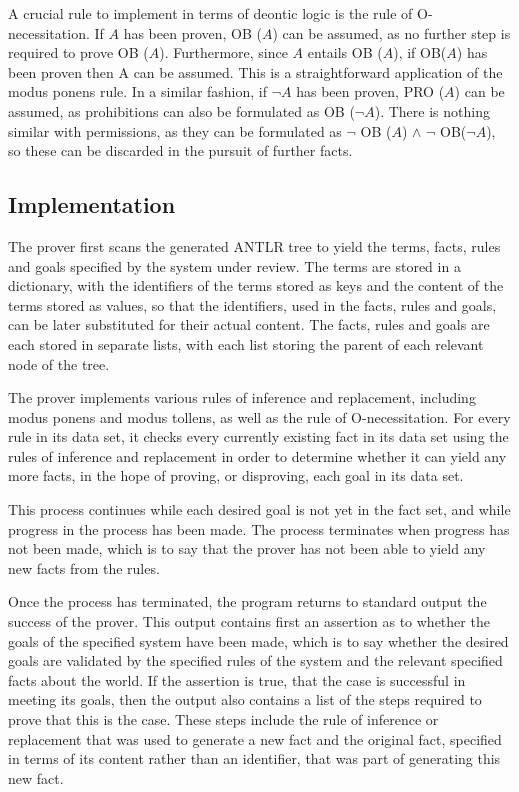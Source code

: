\documentclass{l4proj}
\begin{document}
A crucial rule to implement in terms of deontic logic is the rule of O-necessitation. If $A$ has been proven, OB ($A$) can be assumed, as no further step is required to prove OB ($A$). Furthermore, since $A$ entails OB ($A$), if OB($A$) has been proven then A can be assumed. This is a straightforward application of the modus ponens rule. In a similar fashion, if $\neg A$ has been proven, PRO ($A$) can be assumed, as prohibitions can also be formulated as OB ($\neg A$). There is nothing similar with permissions, as they can be formulated as $\neg$ OB ($A$) $\land$ $\neg$ OB($\neg A$), so these can be discarded in the pursuit of further facts. 

\subsection{Implementation}
The prover first scans the generated ANTLR tree to yield the terms, facts, rules and goals specified by the system under review. The terms are stored in a dictionary, with the identifiers of the terms stored as keys and the content of the terms stored as values, so that the identifiers, used in the facts, rules and goals, can be later substituted for their actual content. The facts, rules and goals are each stored in separate lists, with each list storing the parent of each relevant node of the tree. 

The prover implements various rules of inference and replacement, including modus ponens and modus tollens, as well as the rule of O-necessitation. For every rule in its data set, it checks every currently existing fact in its data set using the rules of inference and replacement in order to determine whether it can yield any more facts, in the hope of proving, or disproving, each goal in its data set. 

This process continues while each desired goal is not yet in the fact set, and while progress in the process has been made. The process terminates when progress has not been made, which is to say that the prover has not been able to yield any new facts from the rules. 

Once the process has terminated, the program returns to standard output the success of the prover. This output contains first an assertion as to whether the goals of the specified system have been made, which is to say whether the desired goals are validated by the specified rules of the system and the relevant specified facts about the world. If the assertion is true, that the case is successful in meeting its goals, then the output also contains a list of the steps required to prove that this is the case. These steps include the rule of inference or replacement that was used to generate a new fact and the original fact, specified in terms of its content rather than an identifier, that was part of generating this new fact. 
\end{document}
